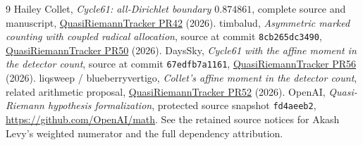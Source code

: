 \documentclass[10pt,a4paper]{article}
\begin{document}
\begin{thebibliography}{9}\small
{} Hailey Collet, \emph{Cycle61: all-Dirichlet boundary
$0.874861$}, complete source and manuscript,
\href{https://github.com/GTimG/QuasiRiemannTracker/pull/42}{QuasiRiemannTracker PR42} (2026).
 timbalud, \emph{Asymmetric marked counting with coupled
radical allocation}, source at commit \texttt{8cb265dc3490},
\href{https://github.com/GTimG/QuasiRiemannTracker/pull/50}{QuasiRiemannTracker PR50} (2026).
 DaysSky, \emph{Cycle61 with the affine moment in the detector
count}, source at commit \texttt{67edfb7a1161},
\href{https://github.com/GTimG/QuasiRiemannTracker/pull/56}{QuasiRiemannTracker PR56} (2026).
 liqsweep / blueberryvertigo, \emph{Collet's affine moment in the
detector count}, related arithmetic proposal,
\href{https://github.com/GTimG/QuasiRiemannTracker/pull/52}{QuasiRiemannTracker PR52} (2026).
 OpenAI, \emph{Quasi-Riemann hypothesis formalization}, protected
source snapshot \texttt{fd4aeeb2}, \url{https://github.com/OpenAI/math}.
See the retained source notices for Akash Levy's weighted numerator and the
full dependency attribution.
\end{thebibliography}
\end{document}
